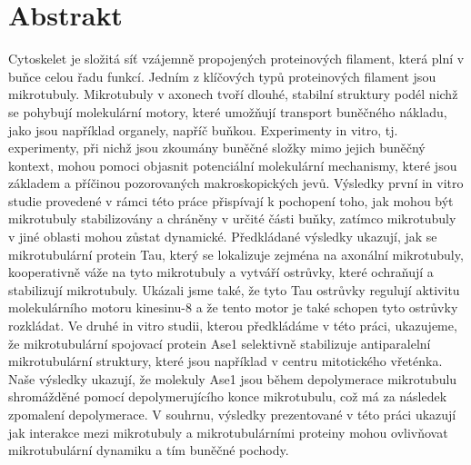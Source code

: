 \chapter*{Abstrakt}
Cytoskelet je složitá síť vzájemně propojených proteinových filament, která plní v buňce celou řadu funkcí. Jedním z klíčových typů proteinových filament jsou mikrotubuly. Mikrotubuly v axonech tvoří dlouhé, stabilní struktury podél nichž se pohybují molekulární motory, které umožňují transport buněčného nákladu, jako jsou například organely, napříč buňkou. Experimenty in vitro, tj. experimenty, při nichž jsou zkoumány buněčné složky mimo jejich buněčný kontext, mohou pomoci objasnit potenciální molekulární mechanismy, které jsou základem a příčinou pozorovaných makroskopických jevů. Výsledky první in vitro studie provedené v rámci této práce přispívají k pochopení toho, jak mohou být mikrotubuly stabilizovány a chráněny v určité části buňky, zatímco mikrotubuly v jiné oblasti mohou zůstat dynamické. Předkládané výsledky ukazují, jak se mikrotubulární protein Tau, který se lokalizuje zejména na axonální mikrotubuly, kooperativně váže na tyto mikrotubuly a vytváří ostrůvky, které ochraňují a stabilizují mikrotubuly. Ukázali jsme také, že tyto Tau ostrůvky regulují aktivitu molekulárního motoru kinesinu-8 a že tento motor je také schopen tyto ostrůvky rozkládat. Ve druhé in vitro studii, kterou předkládáme v této práci, ukazujeme, že mikrotubulární spojovací protein Ase1 selektivně stabilizuje antiparalelní mikrotubulární struktury, které jsou například v centru mitotického vřeténka. Naše výsledky ukazují, že molekuly Ase1 jsou během depolymerace mikrotubulu shromážděné pomocí depolymerujícího konce mikrotubulu, což má za následek zpomalení depolymerace. V souhrnu, výsledky prezentované v této práci ukazují jak interakce mezi mikrotubuly a mikrotubulárními proteiny mohou ovlivňovat mikrotubulární dynamiku a tím buněčné pochody.
